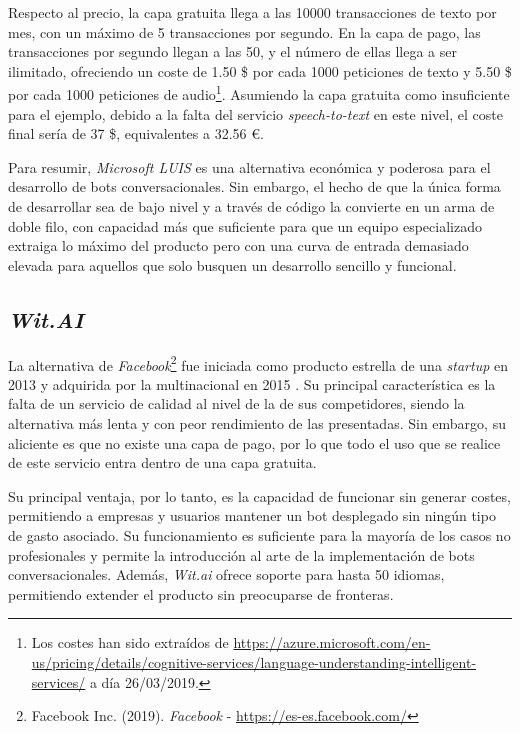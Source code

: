 \documentclass[11pt,spanish,listoffigures]{tfgetsinf}
\begin{document}
Respecto al precio, la capa gratuita llega a las 10000 transacciones de texto por mes, con un máximo de 5 transacciones por segundo. En la capa de pago, las transacciones por segundo llegan a las 50, y el número de ellas llega a ser ilimitado, ofreciendo un coste de 1.50 \$ por cada 1000 peticiones de texto y 5.50 \$ por cada 1000 peticiones de audio\footnote{Los costes han sido extraídos de \url{https://azure.microsoft.com/en-us/pricing/details/cognitive-services/language-understanding-intelligent-services/} a día 26/03/2019.}. Asumiendo la capa gratuita como insuficiente para el ejemplo, debido a la falta del servicio \textit{speech-to-text} en este nivel, el coste final sería de 37 \$, equivalentes a 32.56 \euro.

Para resumir, \textit{Microsoft LUIS} es una alternativa económica y poderosa para el desarrollo de bots conversacionales. Sin embargo, el hecho de que la única forma de desarrollar sea de bajo nivel y a través de código la convierte en un arma de doble filo, con capacidad más que suficiente para que un equipo especializado extraiga lo máximo del producto pero con una curva de entrada demasiado elevada para aquellos que solo busquen un desarrollo sencillo y funcional.

\subsection{\textit{Wit.AI}}
\label{sec:wit-ai}

La alternativa de \textit{Facebook}\footnote{Facebook Inc. (2019). \textit{Facebook} - \url{https://es-es.facebook.com/}} fue iniciada como producto estrella de una \textit{startup} en 2013 y adquirida por la multinacional en 2015 \cite{wit-ai}. Su principal característica es la falta de un servicio de calidad al nivel de la de sus competidores, siendo la alternativa más lenta y con peor rendimiento de las presentadas. Sin embargo, su aliciente es que no existe una capa de pago, por lo que todo el uso que se realice de este servicio entra dentro de una capa gratuita.

Su principal ventaja, por lo tanto, es la capacidad de funcionar sin generar costes, permitiendo a empresas y usuarios mantener un bot desplegado sin ningún tipo de gasto asociado. Su funcionamiento es suficiente para la mayoría de los casos no profesionales y permite la introducción al arte de la implementación de bots conversacionales. Además, \textit{Wit.ai} ofrece soporte para hasta 50 idiomas, permitiendo extender el producto sin preocuparse de fronteras.
\end{document}
